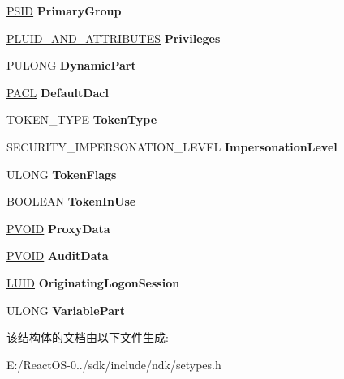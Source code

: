 \begin{DoxyCompactItemize}
\hyperlink{struct___s_i_d}{P\+S\+ID} {\bfseries Primary\+Group}
\item 
\mbox{\label{struct___t_o_k_e_n_a5d5a2056cb623b24726826d19588b2f0}} 
\hyperlink{struct___l_u_i_d___a_n_d___a_t_t_r_i_b_u_t_e_s}{P\+L\+U\+I\+D\+\_\+\+A\+N\+D\+\_\+\+A\+T\+T\+R\+I\+B\+U\+T\+ES} {\bfseries Privileges}
\item 
\mbox{\label{struct___t_o_k_e_n_ad112dfe825a839be7492439abb336ab1}} 
P\+U\+L\+O\+NG {\bfseries Dynamic\+Part}
\item 
\mbox{\label{struct___t_o_k_e_n_aa508e08f4f211cb247f6aad3df4a1254}} 
\hyperlink{struct___a_c_l}{P\+A\+CL} {\bfseries Default\+Dacl}
\item 
\mbox{\label{struct___t_o_k_e_n_a719f8090566867f40886d9e9d39f5b1e}} 
T\+O\+K\+E\+N\+\_\+\+T\+Y\+PE {\bfseries Token\+Type}
\item 
\mbox{\label{struct___t_o_k_e_n_a141da7c3095091837f527055d6072809}} 
S\+E\+C\+U\+R\+I\+T\+Y\+\_\+\+I\+M\+P\+E\+R\+S\+O\+N\+A\+T\+I\+O\+N\+\_\+\+L\+E\+V\+EL {\bfseries Impersonation\+Level}
\item 
\mbox{\label{struct___t_o_k_e_n_a7900ffd3ab252ac6d6d980589963ee13}} 
U\+L\+O\+NG {\bfseries Token\+Flags}
\item 
\mbox{\label{struct___t_o_k_e_n_a994f9c8dd0ed985a012898e283562761}} 
\hyperlink{_processor_bind_8h_a112e3146cb38b6ee95e64d85842e380a}{B\+O\+O\+L\+E\+AN} {\bfseries Token\+In\+Use}
\item 
\mbox{\label{struct___t_o_k_e_n_a6e4d00c91bbe28b11e1c3cc5129d75a0}} 
\hyperlink{interfacevoid}{P\+V\+O\+ID} {\bfseries Proxy\+Data}
\item 
\mbox{\label{struct___t_o_k_e_n_a9c163ee24011c9f7c1d8829ef852522e}} 
\hyperlink{interfacevoid}{P\+V\+O\+ID} {\bfseries Audit\+Data}
\item 
\mbox{\label{struct___t_o_k_e_n_ab1433700686522fadc3f761f9b44a6e3}} 
\hyperlink{struct___l_u_i_d}{L\+U\+ID} {\bfseries Originating\+Logon\+Session}
\item 
\mbox{\label{struct___t_o_k_e_n_a4bac394217a2e3e9b39e3e99caf55853}} 
U\+L\+O\+NG {\bfseries Variable\+Part}
\end{DoxyCompactItemize}


该结构体的文档由以下文件生成\+:\begin{DoxyCompactItemize}
\item 
E\+:/\+React\+O\+S-\/0../sdk/include/ndk/setypes.\+h\end{DoxyCompactItemize}
